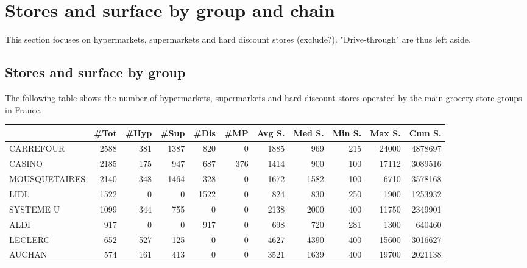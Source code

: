 \documentclass[11pt]{article}
\begin{document}
\section{Stores and surface by group and chain}

This section focuses on hypermarkets, supermarkets and hard discount stores (exclude?). "Drive-through" are thus left aside.

\subsection{Stores and surface by group}

The following table shows the number of hypermarkets, supermarkets and hard discount stores operated by the main grocery store groups in France. 

\begin{table}[H]
\footnotesize
\setlength{\tabcolsep}{2pt}
\begin{tabular}{lrrrrrrrrrr}
\toprule
{} &       \#Tot &       \#Hyp &       \#Sup &       \#Dis &        \#MP &     Avg S. &     Med S. &     Min S. &     Max S. &     Cum S. \\
\midrule
CARREFOUR      &       2588 &        381 &       1387 &        820 &          0 &       1885 &        969 &        215 &      24000 &    4878697 \\
CASINO         &       2185 &        175 &        947 &        687 &        376 &       1414 &        900 &        100 &      17112 &    3089516 \\
MOUSQUETAIRES  &       2140 &        348 &       1464 &        328 &          0 &       1672 &       1582 &        100 &       6710 &    3578168 \\
LIDL           &       1522 &          0 &          0 &       1522 &          0 &        824 &        830 &        250 &       1900 &    1253932 \\
SYSTEME U      &       1099 &        344 &        755 &          0 &          0 &       2138 &       2000 &        400 &      11750 &    2349901 \\
ALDI           &        917 &          0 &          0 &        917 &          0 &        698 &        720 &        281 &       1300 &     640460 \\
LECLERC        &        652 &        527 &        125 &          0 &          0 &       4627 &       4390 &        400 &      15600 &    3016627 \\
AUCHAN         &        574 &        161 &        413 &          0 &          0 &       3521 &       1639 &        400 &      19700 &    2021138 \\

\end{tabular}
\end{table}
\end{document}

